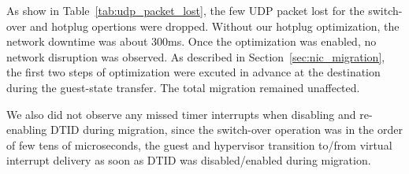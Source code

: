 As show in Table~\ref{tab:udp_packet_lost}, the few UDP packet
lost for the switch-over and hotplug opertions were dropped.
Without our hotplug optimization, the network downtime was
about 300ms. Once the optimization was enabled, no network
disruption was observed. As described in
Section~\ref{sec:nic_migration}, the first two steps of
optimization were excuted in advance at the destination during
the guest-state transfer. The total migration remained
unaffected.

We also did not observe any missed timer interrupts when
disabling and re-enabling DTID during migration, since the
switch-over operation was in the order of few tens of
microseconds, the guest and hypervisor transition to/from
virtual interrupt delivery as soon as DTID was
disabled/enabled during migration.






